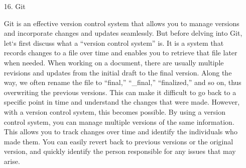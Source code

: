 \documentclass[conference, a4paper]{IEEEtran}
\begin{document}
\begin{enumerate}
\begin{enumerate}
        \item[16.]Git \cite{velog-git}
        \item[]Git is an effective version control system that allows you to manage versions and incorporate changes and updates seamlessly. But before delving into Git, let`s first discuss what a ``version control system'' is. It is a system that records changes to a file over time and enables you to retrieve that file later when needed. When working on a document, there are usually multiple revisions and updates from the initial draft to the final version. Along the way, we often rename the file to ``final,'' ``\_final,'' ``finalized,'' and so on, thus overwriting the previous versions. This can make it difficult to go back to a specific point in time and understand the changes that were made. However, with a version control system, this becomes possible. By using a version control system, you can manage multiple versions of the same information. This allows you to track changes over time and identify the individuals who made them. You can easily revert back to previous versions or the original version, and quickly identify the person responsible for any issues that may arise.\\
    \end{enumerate}
\end{enumerate}
\end{document}
